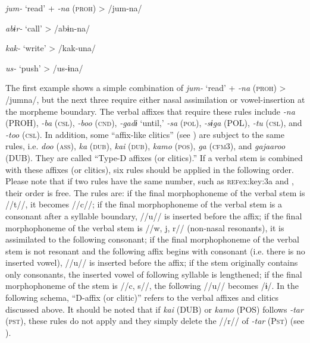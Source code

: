 \ea\label{ex:8-16}
\ea \textit{jum-}  ‘read’  +  \textit{-na} (\textsc{proh})  >  /jum-na/


\ex \textit{abɨr-}  ‘call’        >  /abɨn-na/


\ex \textit{kak-}  ‘write’        >  /kak-una/


\ex \textit{us-}  ‘push’        >  /us-ɨna/
\z

The first example shows a simple combination of \textit{jum-} ‘read’ + \textit{-na} (\textsc{proh}) > /jumna/, but the next three require either nasal assimilation or vowel-insertion at the morpheme boundary. The verbal affixes that require these rules include \textit{-na} (PROH), \textit{-ba} (\textsc{csl}), \textit{-boo} (\textsc{cnd}), \textit{-gadɨ} ‘until,’ \textit{-sa} (\textsc{pol}), \textit{-sɨga} (POL), \textit{-tu} (\textsc{csl}), and \textit{-too} (\textsc{csl}). In addition, some “affix-like clitics” (see ) are subject to the same rules, i.e. \textit{doo} (\textsc{ass}), \textit{ka} (\textsc{dub}), \textit{kai} (\textsc{dub}), \textit{kamo} (\textsc{pos}), \textit{ga} (\textsc{cfm3}), and \textit{gajaaroo} (DUB). They are called “Type-D affixes (or clitics).” If a verbal stem is combined with these affixes (or clitics), six rules should be applied in the following order. Please note that if two rules have the same number, such as \textsc{ref}{ex:key:3a} and , their order is free. The rules are:  if the final morphophoneme of the verbal stem is //t//, it becomes //c//;  if the final morphophoneme of the verbal stem is a consonant after a syllable boundary, //u// is inserted before the affix;  if the final morphophoneme of the verbal stem is //w, j, r// (non-nasal resonants), it is assimilated to the following consonant;  if the final morphophoneme of the verbal stem is not resonant and the following affix begins with consonant (i.e. there is no inserted vowel), //u// is inserted before the affix;  if the stem originally contains only consonants, the inserted vowel of following syllable is lengthened;  if the final morphophoneme of the stem is //c, s//, the following //u// becomes /ɨ/. In the following schema, “D-affix (or clitic)” refers to the verbal affixes and clitics discussed above. It should be noted that if \textit{kai} (DUB) or \textit{kamo} (POS) follows \textit{-tar} (\textsc{pst}), these rules do not apply and they simply delete the //r// of \textit{-tar} (P\textsc{st}) (see ).

